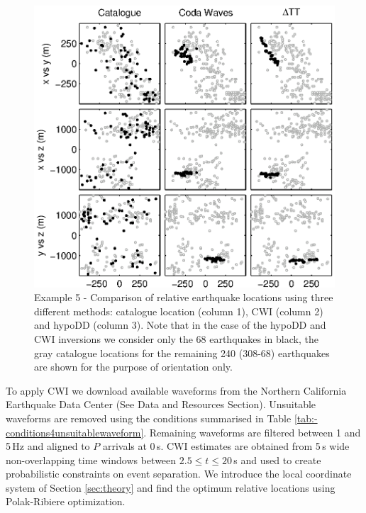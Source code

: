 \documentclass[extra, onecolumn, doublespacing]{gji}
\begin{document}
\begin{figure}
\includegraphics{diags/CalaverasLoc1_hypoDD_SVD.eps}
\caption{Example 5 - Comparison of relative earthquake locations
using three different methods: catalogue location (column 1), CWI
(column 2) and hypoDD (column 3). Note that in the case of the
hypoDD and CWI inversions we consider only the 68 earthquakes in
black, the gray catalogue locations for the remaining 240 (308-68)
earthquakes are shown for the purpose of orientation only.}
\label{fig-69Calaverasevents_eg1}
\end{figure}

To apply CWI we download available waveforms from the Northern
California Earthquake Data Center (See Data and Resources Section).
Unsuitable waveforms are removed using the conditions summarised in
Table \ref{tab:-conditions4unsuitablewaveform}. Remaining waveforms
are filtered between 1 and 5\,Hz and aligned  to $P$ arrivals at
0\,s. CWI estimates are obtained from 5\,s wide non-overlapping time
windows between $2.5 \leq t \leq 20$\,s and used to create
probabilistic constraints on event separation. We introduce the
local coordinate system of Section \ref{sec:theory} and find the
optimum relative locations using Polak-Ribiere optimization.
\end{document}
